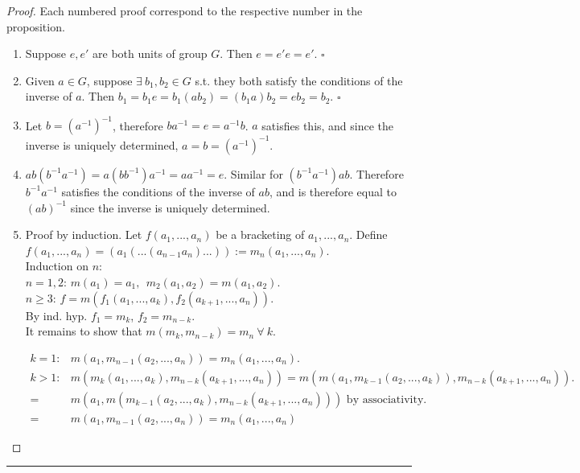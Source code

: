 \documentclass{article}
\theoremstyle{definition}
\theoremstyle{remark}
\begin{document}
\begin{proof} Each numbered proof correspond to the respective number in the proposition.
\begin{enumerate}
\item Suppose $e, e\prime$ are both units of group $G$. Then $e=e' e = e'$. $\square$
\item Given $a \in G$, suppose $\exists~ b_1,b_2 \in G$ s.t. they both satisfy the conditions of the inverse of $a$. Then $b_1=b_1 e = b_1(ab_2)=(b_1a)b_2=eb_2=b_2$. $\square$
\item Let $b=(a^{-1})^{-1}$, therefore $ba^{-1}=e=a^{-1} b$. $a$ satisfies this, and since the inverse is uniquely determined, $a=b=(a^{-1})^{-1}$.
\item $ ab(b^{-1}a^{-1})=a(bb^{-1})a^{-1}=aa^{-1}=e$. Similar for $(b^{-1}a^{-1})ab$. Therefore $b^{-1}a^{-1} $ satisfies the conditions of the inverse of $ab$, and is therefore equal to $(ab)^{-1}$ since the inverse is uniquely determined. 
\item Proof by induction. Let $f(a_1,...,a_n)$ be a bracketing of $a_1,...,a_n$. Define $f(a_1,...,a_n)=(a_1(...(a_{n-1}a_n)...)):=m_n(a_1,...,a_n)$.
\vspace{2mm}\\
Induction on $n$:\\ $n=1,2$: $m(a_1)=a_1,~~m_2(a_1,a_2)=m(a_1,a_2)$.\\$n\geq 3$: $f=m(f_1(a_1,...,a_k),f_2(a_{k+1},...,a_n))$.\\
By ind. hyp. $f_1=m_k$, $f_2=m_{n-k}$.\\
It remains to show that $m(m_k,m_{n-k})=m_n~\forall~ k$.

\begin{align*}
k=1:& m(a_1,m_{n-1}(a_2,...,a_n))=m_n(a_1,...,a_n).\\
k > 1:& m(m_k(a_1,...,a_k),m_{n-k}(a_{k+1},...,a_n))=m(m(a_1,m_{k-1}(a_2,...,a_k)),m_{n-k}(a_{k+1},...,a_n)).\\ =&m(a_1,m(m_{k-1}(a_2,...,a_k),m_{n-k}(a_{k+1},...,a_n))) \text{ by associativity.}\\
=&m(a_1,m_{n-1}(a_2,...,a_n))=m_n(a_1,...,a_n)
\end{align*}
\end{enumerate}
\end{proof}
\hrule
\end{document}

